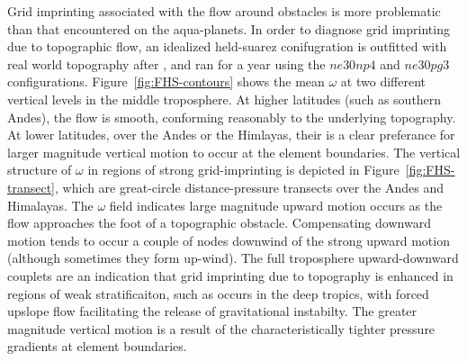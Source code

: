 \documentclass[twocol]{ametsoc}
\begin{document}
Grid imprinting associated with the flow around obstacles is more problematic than that encountered on the aqua-planets. In order to diagnose grid imprinting due to topographic flow, an idealized held-suarez conifugration \citep{HS1994} is outfitted with real world topography after \cite{FRETAL2000WMR,BETAL2006MWR}, and ran for a year using the $ne30np4$ and $ne30pg3$ configurations. Figure~\ref{fig:FHS-contours} shows the mean $\omega$ at two different vertical levels in the middle troposphere. At higher latitudes (such as southern Andes), the flow is smooth, conforming reasonably to the underlying topography. At lower latitudes, over the Andes or the Himlayas, their is a clear preferance for larger magnitude vertical motion to occur at the element boundaries. The vertical structure of $\omega$ in regions of strong grid-imprinting is depicted in Figure~\ref{fig:FHS-transect}, which are great-circle distance-pressure transects over the Andes and Himalayas. The $\omega$ field indicates large magnitude upward motion occurs as the flow approaches the foot of a topographic obstacle. Compensating downward motion tends to occur a couple of nodes downwind of the strong upward motion (although sometimes they form up-wind). The full troposphere upward-downward couplets are an indication that grid imprinting due to topography is enhanced in regions of weak stratificaiton, such as occurs in the deep tropics, with forced upslope flow facilitating the release of gravitational instabilty. The greater magnitude vertical motion is a result of the characteristically tighter pressure gradients at element boundaries. 
\end{document}
